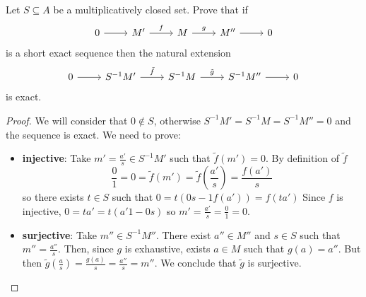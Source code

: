 \begin{problem}
    Let $S \subseteq A$ be a multiplicatively closed set.
    Prove that if
    \[\begin{tikzcd}
	0 & {M'} & M & {M''} & 0
	\arrow[from=1-1, to=1-2]
	\arrow["f", from=1-2, to=1-3]
	\arrow["g", from=1-3, to=1-4]
	\arrow[from=1-4, to=1-5]
    \end{tikzcd}\]
    is a short exact sequence then the natural extension
    \[\begin{tikzcd}
	0 & {S^{-1}M'} & {S^{-1}M} & {S^{-1}M''} & 0
	\arrow[from=1-1, to=1-2]
	\arrow["{\tilde{f}}", from=1-2, to=1-3]
	\arrow["{\tilde{g}}", from=1-3, to=1-4]
	\arrow[from=1-4, to=1-5]
    \end{tikzcd}\]
    is exact.
    \begin{sol}
        \begin{proof}
            We will consider that $0 \notin S$, otherwise $S^{-1}M' = S^{-1}M = S^{-1}M'' = 0$ and the sequence is exact.
            We need to prove:
            \begin{itemize}
                \item {}\textbf{ injective}:
                Take $m' = \frac{a'}{s} \in S^{-1}M'$ such that $\tilde{f}(m') = 0$.
                By definition of $\tilde{f}$
                \[
                    \frac{0}{1} = 0 = \tilde{f}(m') = \tilde{f}\left(\frac{a'}{s}\right) = \frac{f(a')}{s}
                \]
                so there exists $t \in S$ such that $0 = t (0 s - 1 f(a')) = f(t a')$
                Since $f$ is injective, $0 = t a' = t (a'1 - 0 s)$ so
                $m' = \frac{a'}{s} = \frac{0}{1} = 0$.

                \item {}\textbf{ surjective}:
                Take $m'' \in S^{-1}M''$.
                There exist $a'' \in M''$ and $s \in S$ such that $m'' = \frac{a''}{s}$.
                Then, since $g$ is exhaustive, exists $a \in M$ such that $g(a) = a''$.
                But then $\tilde{g}(\frac{a}{s}) = \frac{g(a)}{s} = \frac{a''}{s} = m''$.
                We conclude that $\tilde{g}$ is surjective.


\end{itemize}
\end{proof}
\end{sol}
\end{problem}
